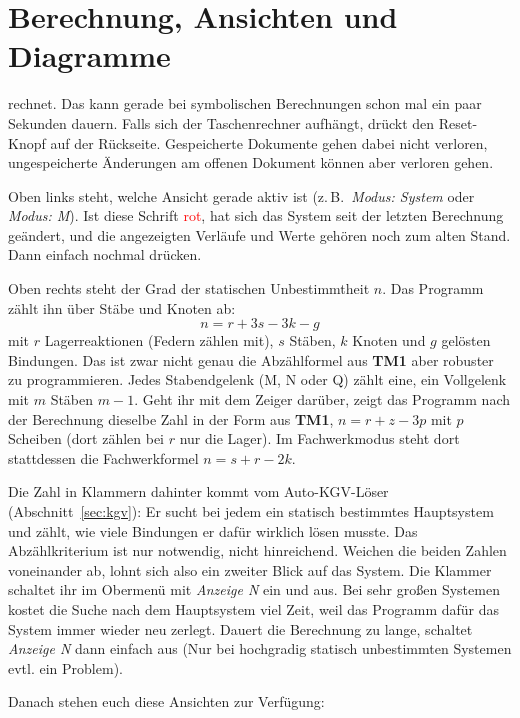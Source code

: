\section{Berechnung, Ansichten und Diagramme}

 rechnet. Das kann gerade bei symbolischen Berechnungen schon mal ein paar Sekunden dauern.
Falls sich der Taschenrechner aufhängt, drückt den Reset-Knopf auf der Rückseite. Gespeicherte Dokumente gehen dabei nicht
verloren, ungespeicherte Änderungen am offenen Dokument können aber verloren gehen.

Oben links steht, welche Ansicht gerade aktiv ist (z.\,B.\ \emph{Modus: System} oder
\emph{Modus: M}). Ist diese Schrift \textcolor{red}{rot}, hat sich das System seit der letzten
Berechnung geändert, und die angezeigten Verläufe und Werte gehören noch zum alten Stand. Dann
einfach nochmal  drücken.

Oben rechts steht der Grad der statischen Unbestimmtheit $n$. Das Programm zählt ihn über Stäbe und
Knoten ab:
\[
  n = r + 3s - 3k - g
\]
mit $r$ Lagerreaktionen (Federn zählen mit), $s$ Stäben, $k$ Knoten und $g$ gelösten Bindungen. 
Das ist zwar nicht genau die Abzählformel aus \textbf{TM1} aber robuster zu programmieren.
Jedes Stabendgelenk (M, N oder Q) zählt eine, ein Vollgelenk mit $m$ Stäben $m-1$. Geht ihr mit dem
Zeiger darüber, zeigt das Programm nach der Berechnung dieselbe Zahl in der Form aus \textbf{TM1},
$n = r + z - 3p$ mit $p$ Scheiben (dort zählen bei $r$ nur die Lager). Im Fachwerkmodus steht dort
stattdessen die Fachwerkformel $n = s + r - 2k$.

Die Zahl in Klammern dahinter kommt vom Auto-KGV-Löser (Abschnitt~\ref{sec:kgv}): Er sucht bei
jedem  ein statisch bestimmtes Hauptsystem und zählt, wie viele Bindungen er dafür wirklich
lösen musste. Das Abzählkriterium ist nur notwendig, nicht hinreichend. Weichen die beiden Zahlen
voneinander ab, lohnt sich also ein zweiter Blick auf das System. Die Klammer schaltet ihr im
Obermenü mit \emph{Anzeige N} ein und aus. Bei sehr großen Systemen kostet die Suche nach dem
Hauptsystem viel Zeit, weil das Programm dafür das System immer wieder neu zerlegt. Dauert die
Berechnung zu lange, schaltet \emph{Anzeige N} dann einfach aus (Nur bei hochgradig statisch unbestimmten 
Systemen evtl. ein Problem).

Danach stehen euch diese Ansichten zur Verfügung:

